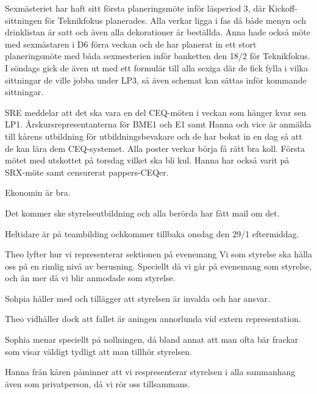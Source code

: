 \documentclass[10pt]{article}
\begin{document}
\begin{paragrafer}
\begin{paragrafer}
Sexmästeriet har haft sitt första planeringsmöte inför läsperiod 3, där Kickoff-sittningen för Teknikfokus planerades. Alla verkar ligga i fas då både menyn och drinklistan är satt och även alla dekorationer är beställda. Anna hade också möte med sexmästaren i D6 förra veckan och de har planerat in ett stort planeringsmöte med båda sexmesterien inför banketten den 18/2 för Teknikfokus. I söndags gick de även ut med ett formulär till alla sexiga där de fick fylla i vilka sittningar de ville jobba under LP3, så även schemat kan sättas inför kommande sittningar. 

SRE meddelar att det ska vara en del CEQ-möten i veckan som hänger kvar sen LP1. Årskursrepresentanterna för BME1 och E1 samt Hanna och vice är anmälda till kårens utbildning för utbildningsbevakare och de har bokat in en dag så att de kan lära dem CEQ-systemet. Alla poster verkar börja få rätt bra koll. Första mötet med utskottet på torsdag vilket ska bli kul. Hanna har också varit på SRX-möte samt censurerat pappers-CEQer.


 
Ekonomin är bra.


Det kommer ske styrelseutbildning och alla berörda har fått mail om det.

Heltidare är på teambilding ochkommer tillbaka onsdag den 29/1 eftermiddag.


\end{paragrafer}


Theo lyfter hur vi representerar sektionen på evenemang
Vi som styrelse ska hålla oss på en rimlig nivå av berusning.
Speciellt då vi går på evenemang som styrelse, och än mer då vi blir anmodade som styrelse.

Sohpia håller med och tillägger att styrelsen är invalda och har ansvar.

Theo vidhåller dock att fallet är aningen annorlunda vid extern representation.

Sophia menar speciellt på nollningen, då bland annat att man ofta bär frackar som visar väldigt tydligt att man tillhör styrelsen.

Hanna från kåren påminner att vi respresenterar styrelsen i alla sammanhang även som privatperson, då vi rör oss tillsammans.



\end{paragrafer}
\end{document}
